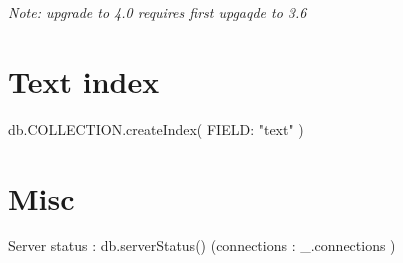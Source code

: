 \textit{Note: upgrade to 4.0 requires first upgaqde to 3.6}



\section*{Text index}

db.COLLECTION.createIndex( { FIELD: "text" } )


\section*{Misc}

Server status : db.serverStatus()
(connections : _.connections )













